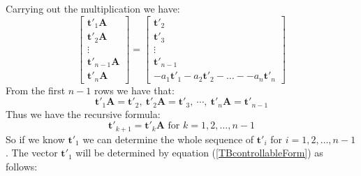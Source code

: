 \documentclass[a4paper,10pt,oneside]{book}
\begin{document}
Carrying out the multiplication we have:
\begin{equation}
 \left[ {\begin{array}{c}
 \mathbf{t}'_1\mathbf{A}\\
 \mathbf{t}'_2\mathbf{A}\\
 \vdots\\
\mathbf{t}'_{n-1}\mathbf{A}\\
 \mathbf{t}'_n\mathbf{A}\end{array} } \right]=\left[ {\begin{array}{c}
 \mathbf{t}'_2\\
 \mathbf{t}'_3\\
 \vdots\\
 \mathbf{t}'_{n-1}\\
 -a_1\mathbf{t}'_1-a_2\mathbf{t}'_2-\ldots--a_n\mathbf{t}'_n  \end{array} } \right]
\end{equation}
From the first $n-1$ rows we have that:
\begin{equation}
 \mathbf{t}'_1\mathbf{A}=\mathbf{t}'_2,\ \mathbf{t}'_2\mathbf{A}=\mathbf{t}'_3,\ \cdots,\ \mathbf{t}'_{n}\mathbf{A}=\mathbf{t}'_{n-1}
\end{equation}
Thus we have the recursive formula:
\begin{equation}
 \mathbf{t}'_{k+1}=\mathbf{t}'_{k}\mathbf{A} \text{ for } k=1,2,\ldots,n-1\label{recursiveFormula}
\end{equation}
So if we know $\mathbf{t}'_1$ we can determine the whole sequence of $\mathbf{t}'_i$ for $i=1,2,\ldots,n-1$. The vector $\mathbf{t}'_1$ will be determined by equation (\ref{TBcontrollableForm}) as follows:
\end{document}
